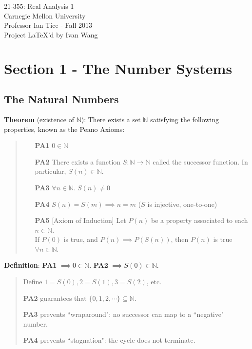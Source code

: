 \documentclass[11pt]{article}
\begin{document}
\begin{titlepage}
	\vspace*{\fill}
	\begin{center}
		{\Huge 21-355: Real Analysis 1}\\[0.5cm]
		{\Large Carnegie Mellon University}\\[0.3cm]
		{\Large Professor Ian Tice - Fall 2013}\\[2cm]
		 Project \LaTeX'd by Ivan Wang
	\end{center}
	\vspace*{\fill}
\end{titlepage}

\newpage

\tableofcontents
\newpage

\section{Section 1 - The Number Systems}

\subsection{The Natural Numbers}

\textbf{Theorem} (existence of $\mathbb{N}$): There exists a set $\mathbb{N}$ satisfying the following properties, known as the Peano Axioms:
\begin{quote}
	\begin{enumerate}
	\item[\bf PA1] $0 \in \mathbb{N}$
	
	\item [\bf PA2] There exists a function $S: \mathbb{N} \to \mathbb{N}$ called the successor function. In particular, $S(n) \in \mathbb{N}$.
	
	\item[\bf PA3] $\forall n \in \mathbb{N}.\; S(n) \neq 0$
	
	\item[\bf PA4] $S(n) = S(m) \implies n = m$ ($S$ is injective, one-to-one)

	\item[\bf PA5] [Axiom of Induction] Let $P(n)$ be a property associated to each $n \in \mathbb{N}$.\\
	If $P(0)$ is true, and $P(n) \implies P(S(n))$, then $P(n)$ is true $\forall n \in \mathbb{N}$.
	\end{enumerate}
\end{quote}

\textbf{Definition}: \textbf{PA1} $\implies 0 \in \mathbb{N}$. \textbf{PA2} $\implies S(0) \in \mathbb{N}$.
\begin{quote}\vspace{-0.3cm}
	Define $1 = S(0), 2 = S(1), 3 = S(2)$, etc.

	\textbf{PA2} guarantees that $\{0, 1, 2, \cdots\} \subseteq \mathbb{N}$.

	\textbf{PA3} prevents ``wraparound": no successor can map to a ``negative" number.

	\textbf{PA4} prevents ``stagnation": the cycle does not terminate.
\end{quote}
\end{document}
